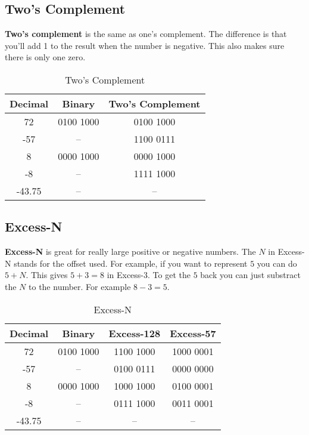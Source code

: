 \subsection{Two's Complement}
{\bf Two's complement} is the same as one's complement.
The difference is that you'll add 1 to the result when the number is negative.
This also makes sure there is only one zero.

\begin{table}[h]
	\centering
	\begin{tabular}{c | c | c}
		Decimal & Binary    & Two's Complement \\
		\hline
		72      & 0100 1000 & 0100 1000        \\
		-57     & --        & 1100 0111        \\
		8       & 0000 1000 & 0000 1000        \\
		-8      & --        & 1111 1000        \\
		-43.75  & --        & --               \\
	\end{tabular}
	\caption{Two's Complement}
\end{table}

\subsection{Excess-N}
{\bf Excess-N} is great for really large positive or negative numbers.
The \(N\) in Excess-N stands for the offset used.
For example, if you want to represent \(5\) you can do \(5 + N\).
This gives \(5 + 3 = 8\) in Excess-3.
To get the \(5\) back you can just substract the \(N\) to the number.
For example \(8 - 3 = 5\).

\begin{table}[h]
	\centering
	\begin{tabular}{c | c | c | c}
		Decimal & Binary    & Excess-128 & Excess-57 \\
		\hline
		72      & 0100 1000 & 1100 1000  & 1000 0001 \\
		-57     & --        & 0100 0111  & 0000 0000 \\
		8       & 0000 1000 & 1000 1000  & 0100 0001 \\
		-8      & --        & 0111 1000  & 0011 0001 \\
		-43.75  & --        & --         & --        \\
	\end{tabular}
	\caption{Excess-N}
\end{table}

